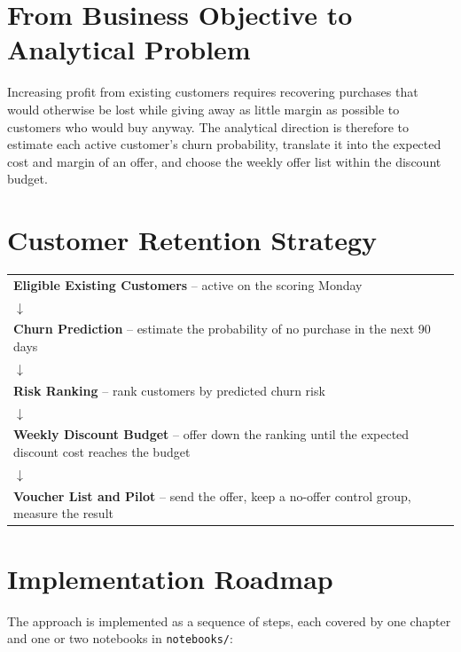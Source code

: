\section{From Business Objective to Analytical Problem}
\label{sec:2-7}

Increasing profit from existing customers requires recovering purchases that would otherwise be lost while giving away as little margin as possible to customers who would buy anyway. The analytical direction is therefore to estimate each active customer's churn probability, translate it into the expected cost and margin of an offer, and choose the weekly offer list within the discount budget.

\section{Customer Retention Strategy}
\label{sec:2-8}

\begin{center}
\begin{tabular}{@{}>{\centering\arraybackslash}p{14cm}@{}}
    \textbf{Eligible Existing Customers} -- active on the scoring Monday \\
    $\downarrow$ \\
    \textbf{Churn Prediction} -- estimate the probability of no purchase in the next 90 days \\
    $\downarrow$ \\
    \textbf{Risk Ranking} -- rank customers by predicted churn risk \\
    $\downarrow$ \\
    \textbf{Weekly Discount Budget} -- offer down the ranking until the expected discount cost reaches the budget \\
    $\downarrow$ \\
    \textbf{Voucher List and Pilot} -- send the offer, keep a no-offer control group, measure the result \\
\end{tabular}
\end{center}

\section{Implementation Roadmap}
\label{sec:2-9}

The approach is implemented as a sequence of steps, each covered by one chapter and one or two notebooks in \texttt{notebooks/}:

